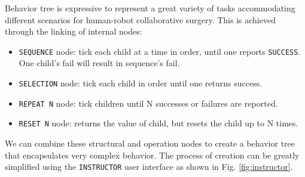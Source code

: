 \documentclass[letterpaper, 10 pt, conference]{ieeeconf}
\begin{document}
%
%

Behavior tree is expressive to represent a great variety of tasks accommodating different scenarios for human-robot collaborative surgery. This is achieved through the linking of internal nodes:
 
\begin{itemize}
\item \texttt{SEQUENCE} node: tick each child at a time in order, until one reports \texttt{SUCCESS}. One child's fail will result in sequence's fail.
\item \texttt{SELECTION} node: tick each child in order until one returns success.
\item \texttt{REPEAT N} node: tick children until N successes or failures are reported.
\item \texttt{RESET N} node: returns the value of child, but resets the child up to N times.
\end{itemize} 

We can combine these structural and operation nodes to create a behavior tree that encapsulates very complex behavior. The process of creation can be greatly simplified using the \texttt{INSTRUCTOR} user interface as shown in Fig. \ref{fig:instructor}.
\end{document}
